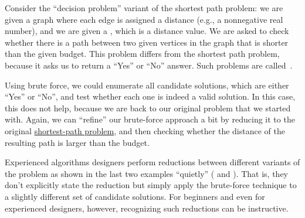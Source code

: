 \begin{cluster}
\label{grp:ex:design::bf::shortest-paths-decision}

\begin{example}
\label{ex:design::bf::shortest-paths-decision}
Consider the ``decision problem'' variant of the shortest path
problem: we are given a graph where each edge is assigned a distance
(e.g., a nonnegative real number), and we are given a ,
which is a distance value.
We are asked to check whether there is a path between two given
vertices in the graph that is shorter than the given budget.  
This problem differs from the shortest path problem, because it asks
us to return a ``Yes'' or ``No'' answer. Such problems are
called~.

Using brute force, we could enumerate all candidate
solutions, which are either ``Yes'' or ``No'', and test whether each
one is indeed a valid solution.
In this case, this does not help, because we are back to our original
problem that we started with.
Again, we can ``refine'' our brute-force approach a bit by reducing it
to the original \href{ex:design::bf::shortest-paths}{shortest-path problem}, and then checking whether the distance of the resulting path is larger than the budget.

\end{example}
\end{cluster}

\begin{cluster}
\label{grp:rmrk:design::basics::experienced}

\begin{remark}
\label{rmrk:design::basics::experienced}
Experienced algorithms designers  perform reductions between
different variants of the problem as shown in the last two examples
``quietly'' ( and
).
That is, they don't explicitly state the reduction but simply apply
the brute-force technique to a slightly different set of candidate
solutions.
For beginners and even for experienced designers, however, recognizing
such reductions can be instructive.

\end{remark}
\end{cluster}

